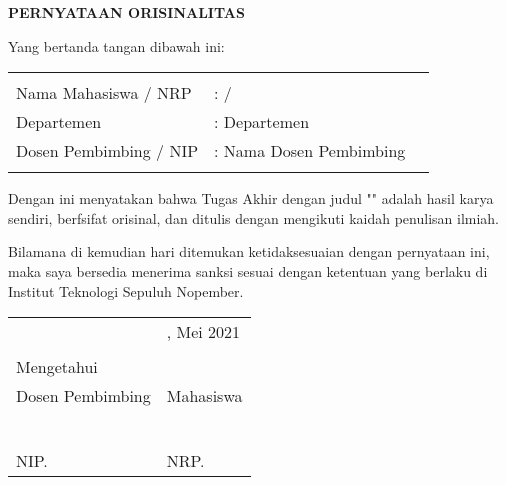 \begin{center}
  \large
  \textbf{PERNYATAAN ORISINALITAS}
\end{center}

\thispagestyle{empty}

\vspace{2ex}


\noindent Yang bertanda tangan dibawah ini:

\noindent\begin{tabularx}{\textwidth}{X X l}
                         &                         \\
  Nama Mahasiswa / NRP   & : \name{} / \nrp{}      \\
  Departemen             & : Departemen            \\
  Dosen Pembimbing / NIP & : Nama Dosen Pembimbing \\
                         &                         \\
\end{tabularx}

Dengan ini menyatakan bahwa Tugas Akhir dengan judul "" adalah hasil karya sendiri, berfsifat orisinal, dan ditulis dengan mengikuti kaidah penulisan ilmiah.

Bilamana di kemudian hari ditemukan ketidaksesuaian dengan pernyataan ini, maka saya bersedia menerima sanksi sesuai dengan ketentuan yang berlaku di Institut Teknologi Sepuluh Nopember.

\vspace{8ex}

\noindent\begin{tabularx}{\textwidth}{X l}
                     & \place{}, Mei 2021 \\
                     &                    \\
  Mengetahui         &                    \\
  Dosen Pembimbing   & Mahasiswa          \\
                     &                    \\
                     &                    \\
                     &                    \\
                     &                    \\
                     &                    \\
  \advisor{}         & \name{}            \\
  NIP. \advisornip{} & NRP. \nrp{}        \\
\end{tabularx}
